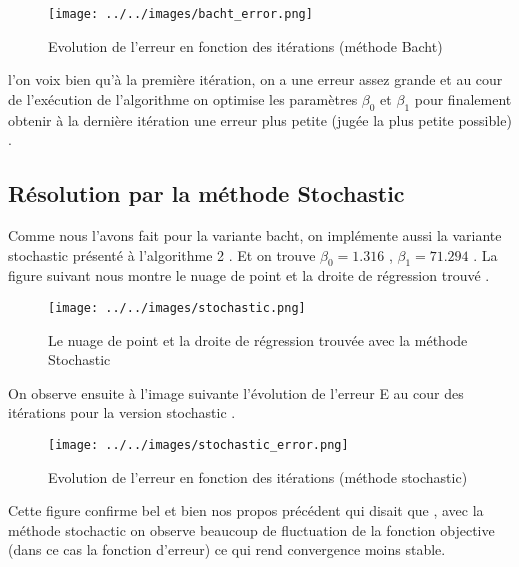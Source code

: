 \documentclass[12pt,a4paper]{article}
\begin{document}
\begin{figure}[here]
\begin{center}
\texttt{[image: ../../images/bacht\_error.png]}
\end{center}
\caption{Evolution de l'erreur en fonction des itérations (méthode Bacht)}
\end{figure}
\vspace{0.2in}

l'on voix bien qu'à la première itération, on a une erreur assez grande et au cour de l'exécution de l'algorithme on optimise les paramètres  $\beta_{0}$ et $\beta_{1}$ pour finalement obtenir à la dernière itération une erreur plus petite (jugée la plus petite possible) .\\

\subsection{Résolution par la méthode Stochastic}

Comme nous l'avons fait pour la variante bacht, on implémente aussi la variante stochastic présenté à l'algorithme 2 . Et on trouve $\beta_{0} = 1.316$ , $\beta_{1} = 71.294$ . La figure suivant nous montre le nuage de point et la droite de régression trouvé .

\vspace{0.2in}
\begin{figure}[here]
\begin{center}
\texttt{[image: ../../images/stochastic.png]}
\end{center}
\caption{Le nuage de point et la droite de régression trouvée avec la méthode Stochastic}
\end{figure}
\vspace{0.2in}

On observe ensuite à l'image suivante l'évolution de l'erreur E au cour des itérations pour la version stochastic . \\

\begin{figure}[here]
\begin{center}
\texttt{[image: ../../images/stochastic\_error.png]}
\end{center}
\caption{Evolution de l'erreur en fonction des itérations (méthode stochastic)}
\end{figure}


Cette figure confirme bel et bien nos propos précédent qui disait que , avec la méthode stochactic on observe beaucoup de fluctuation de la fonction objective (dans ce cas la fonction d'erreur) ce qui rend convergence moins stable.
\end{document}
